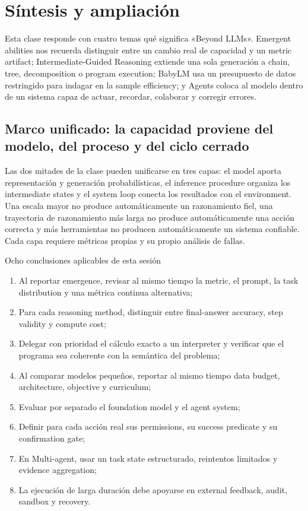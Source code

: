 \section{Síntesis y ampliación}

Esta clase responde con cuatro temas qué significa «Beyond LLMs». Emergent abilities nos recuerda distinguir entre un cambio real de capacidad y un metric artifact; Intermediate-Guided Reasoning extiende una sola generación a chain, tree, decomposition o program execution; BabyLM usa un presupuesto de datos restringido para indagar en la sample efficiency; y Agents coloca al modelo dentro de un sistema capaz de actuar, recordar, colaborar y corregir errores.

\subsection{Marco unificado: la capacidad proviene del modelo, del proceso y del ciclo cerrado}

Las dos mitades de la clase pueden unificarse en tres capas: el model aporta representación y generación probabilísticas, el inference procedure organiza los intermediate states y el system loop conecta los resultados con el environment. Una escala mayor no produce automáticamente un razonamiento fiel, una trayectoria de razonamiento más larga no produce automáticamente una acción correcta y más herramientas no producen automáticamente un sistema confiable. Cada capa requiere métricas propias y su propio análisis de fallas.

\begin{importantbox}{Ocho conclusiones aplicables de esta sesión}
\begin{enumerate}
  \item Al reportar emergence, revisar al mismo tiempo la metric, el prompt, la task distribution y una métrica continua alternativa;
  \item Para cada reasoning method, distinguir entre final-answer accuracy, step validity y compute cost;
  \item Delegar con prioridad el cálculo exacto a un interpreter y verificar que el programa sea coherente con la semántica del problema;
  \item Al comparar modelos pequeños, reportar al mismo tiempo data budget, architecture, objective y curriculum;
  \item Evaluar por separado el foundation model y el agent system;
  \item Definir para cada acción real sus permissions, su success predicate y su confirmation gate;
  \item En Multi-agent, usar un task state estructurado, reintentos limitados y evidence aggregation;
  \item La ejecución de larga duración debe apoyarse en external feedback, audit, sandbox y recovery.
\end{enumerate}
\end{importantbox}


